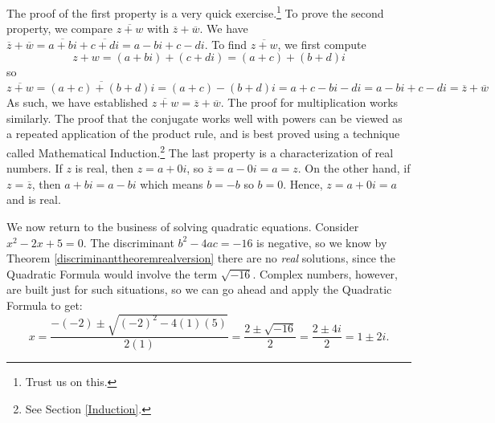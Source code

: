 \documentclass{ximera}
\begin{document}
\smallskip

The proof of the first property is a very quick exercise.\footnote{Trust us on this.}  To prove the second property, we compare $\overline{z+w}$ with $\overline{z} + \overline{w}$.  We have $\overline{z} + \overline{w} = \overline{a+bi} + \overline{c+di}  = a-bi + c-di$.  To find $\overline{z+w}$, we first compute \[z+w = (a+bi) + (c+di) = (a+c)+(b+d)i\] so \[\overline{z+w} = \overline{(a+c)+(b+d)i} = (a+c) - (b+d)i = a+c - bi - di = a - bi + c - di = \overline{z} + \overline{w}\]  As such, we have established  $\overline{z+w} = \overline{z}+\overline{w}$. The proof for multiplication works similarly.  The proof that the conjugate works well with powers can be viewed as a repeated application of the product rule, and is best proved using a technique called Mathematical Induction.\footnote{See Section \ref{Induction}.}  The last property is a characterization of real numbers.  If $z$ is real, then $z = a + 0i$, so $\overline{z} = a - 0i = a = z$.  On the other hand, if $z=\overline{z}$, then $a+bi = a - bi$ which means $b=-b$ so $b=0$.  Hence, $z = a +0i = a$ and is real.

\medskip

We now return to the business of solving quadratic equations. Consider  $x^2-2x+5 = 0$. The discriminant $b^2 - 4ac = -16$ is negative, so we know by Theorem \ref{discriminanttheoremrealversion} there are no \textit{real} solutions, since the Quadratic Formula would involve the term $\sqrt{-16}$.  Complex numbers, however, are built just for such situations, so we can go ahead and apply the Quadratic Formula to get: \[ x = \dfrac{-(-2) \pm \sqrt{(-2)^2-4(1)(5)}}{2(1)} = \dfrac{2 \pm \sqrt{-16}}{2} = \dfrac{2 \pm 4i}{2} = 1 \pm 2i.\]  
\end{document}
